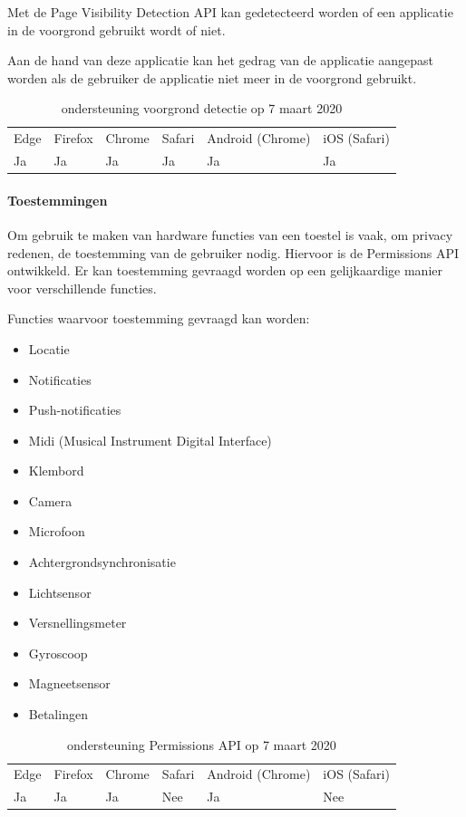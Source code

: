 	Met de Page Visibility Detection API \autocite{Grigorik2017} kan gedetecteerd worden of een applicatie in de voorgrond gebruikt wordt of niet. 
	
	Aan de hand van deze applicatie kan het gedrag van de applicatie aangepast worden als de gebruiker de applicatie niet meer in de voorgrond gebruikt.
	
	\begin{table}[H]
		\centering
		\begin{tabular}{llllll}
			Edge & Firefox & Chrome & Safari & Android (Chrome) & iOS (Safari) \\
			Ja   & Ja      &  Ja     & Ja     & Ja               & Ja          
		\end{tabular}	
		\caption{ondersteuning voorgrond detectie op 7 maart 2020}
	\end{table}
	
	
	\paragraph{Toestemmingen}
	
	Om gebruik te maken van hardware functies van een toestel is vaak, om privacy redenen, de toestemming van de gebruiker nodig. Hiervoor is de Permissions API \autocite{Caceres2017} ontwikkeld. Er kan toestemming gevraagd worden op een gelijkaardige manier voor verschillende functies.
	
	Functies waarvoor toestemming gevraagd kan worden:
	 \begin{itemize}
		\item	Locatie
		\item	Notificaties
		\item	Push-notificaties
		\item	Midi (Musical Instrument Digital Interface)
		\item	Klembord
		\item	Camera
		\item	Microfoon
		\item	Achtergrondsynchronisatie
		\item	Lichtsensor
		\item	Versnellingsmeter
		\item	Gyroscoop
		\item	Magneetsensor
		\item	Betalingen
	\end{itemize}
	
		\begin{table}[H]
			\centering
			\begin{tabular}{llllll}
				Edge & Firefox & Chrome & Safari & Android (Chrome) & iOS (Safari) \\
				Ja   & Ja      &  Ja     & Nee     & Ja               & Nee          
			\end{tabular}	
			\caption{ondersteuning Permissions API op 7 maart 2020}
		\end{table}
		
